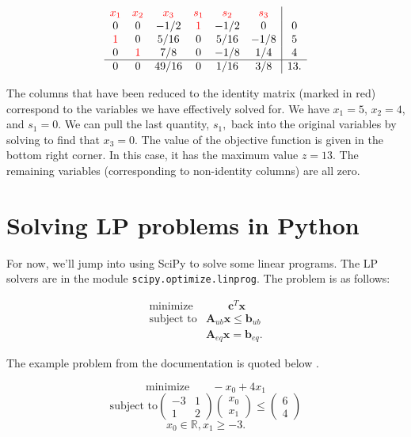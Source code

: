 \documentclass[12pt,english]{article}
\begin{document}
\begin{equation}
\begin{array}{cccccc|c}
\textcolor{red}{x_1}   &     \textcolor{red}{x_2} 	& \textcolor{red}{x_3} & \textcolor{red}{s_1}  & \textcolor{red}{s_2} & \textcolor{red}{s_3}   & 	\\
0 				&	0				&	-1/2	&	\textcolor{red}{1}	&	-1/2	&	0 	&	0 \\
\textcolor{red}{1}	&	0				&	5/16	&	0				&	5/16	&	-1/8	&	5 \\
0				&	\textcolor{red}{1}	&	7/8	&	0				&	-1/8	&	1/4	&	4 \\
\hline
0				&	0				&   49/16  &	0				&	1/16	&	3/8	&	13.
\end{array}
\end{equation}

The columns that have been reduced to the identity matrix (marked in red) correspond to the variables we have effectively solved for.  We have $x_1 = 5$, $x_2 = 4$, and $s_1 = 0$.  We can pull the last quantity, $s_1,$ back into the original variables by solving to find that $x_3 = 0$.  The value of the objective function is given in the bottom right corner.  In this case, it has the maximum value $z = 13$.  The remaining variables (corresponding to non-identity columns) are all zero.

\section{Solving LP problems in Python}

For now, we'll jump into using SciPy to solve some linear programs.   The LP solvers are in the module \texttt{scipy.optimize.linprog}.   The problem is as follows:

$$
\begin{array}{lc}
\text{minimize} & \qquad \mathbf{c}^T \mathbf{x} \\
\text{subject to} 
& \mathbf{A}_{ub} \mathbf{x} \leq \mathbf{b}_{ub}  \\
& \mathbf{A}_{eq} \mathbf{x} = \mathbf{b}_{eq}.
\end{array}
$$

The example problem from the documentation is quoted below \cite{SciPy}.


$$
\text{minimize} \qquad -x_0 + 4x_1
$$
$$
\text{subject to}
\left(
\begin{array}{cc}
-3 & 1 \\
1 & 2 
\end{array}
\right)
\left(
\begin{array}{c}
x_0 \\
x_1
\end{array}
\right)
\leq 
\left(
\begin{array}{c}
6 \\
4
\end{array}
\right)
$$
$$
 x_0 \in \mathbb{R}, x_1 \geq -3.
$$
\end{document}
